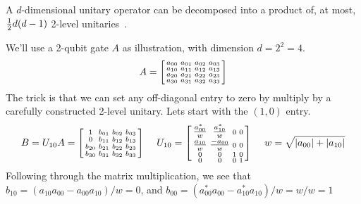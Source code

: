 A $d$-dimensional unitary operator can be decomposed into a product of, at most, $\tfrac{1}{2} d(d-1)$ 2-level unitaries~\cite{Reck1994a,???,???}.

We'll use a 2-qubit gate $A$ as illustration, with dimension $d=2^2=4$. 
\[
A = \begin{bsmallmatrix}
    a_{00} & a_{01} & a_{02} & a_{03} \\ 
    a_{10} & a_{11} & a_{12} & a_{13} \\
    a_{20} & a_{21} & a_{22} & a_{23} \\    
    a_{30} & a_{31} & a_{32} & a_{33}    
    \end{bsmallmatrix}
\]
The trick is that we can set any off-diagonal entry to zero by multiply by a carefully constructed 2-level unitary. Lets start with the $(1,0)$ entry.
\[
B = U_{10} A = \begin{bsmallmatrix}
    1 & b_{01} & b_{02} & b_{03} \\ 
    0 & b_{11} & b_{12} & b_{13} \\
    b_{20} & b_{21} & b_{22} & b_{23} \\    
    b_{30} & b_{31} & b_{32} & b_{33}    
    \end{bsmallmatrix}
    \  \quad
 	U_{10} = \begin{bsmallmatrix}
    \tfrac{a^*_{00}}{w} & \tfrac{a^*_{10}}{w} & 0 & 0 \\ 
    \tfrac{a_{10}}{w} & \tfrac{-a_{00}}{w} & 0 & 0 \\
    0 & 0 & 1 & 0 \\    
    0 & 0 & 0 & 1    
    \end{bsmallmatrix}
\  \quad w = \sqrt{|a_{00}| + |a_{10}|}
\notag
\]
Following through the matrix multiplication, we see that $b_{10} = (a_{10}a_{00} - a_{00}a_{10})/w = 0$, and $b_{00} = 
 (a^*_{00}a_{00} - a^*_{10}a_{10})/w = w/w= 1$

